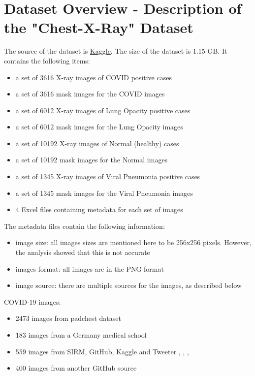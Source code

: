 \documentclass{article}
\begin{document}
\section{Dataset Overview - Description of the "Chest-X-Ray" Dataset} \label{section:data}
The source of the dataset is \href{https://www.kaggle.com/tawsifurrahman/covid19-radiography-database} {Kaggle}. The size of the dataset is 1.15 GB. It contains the following items:
\begin{itemize}
    \item a set of 3616  X-ray images of COVID positive cases
    \item a set of 3616 mask images for the COVID images
    \item a set of 6012  X-ray images of Lung Opacity positive cases
    \item a set of 6012 mask images for the Lung Opacity images
    \item a set of 10192  X-ray images of Normal (healthy) cases
    \item a set of 10192 mask images for the Normal images
    \item a set of 1345  X-ray images of Viral Pneumonia positive cases
    \item a set of 1345 mask images for the Viral Pneumonia images
    \item  4 Excel files containing metadata for each set of images
\end{itemize}

The metadata files contain the following information:
\begin{itemize}
    \item image size: all images sizes are mentioned here to be 256x256 pixels. However, the analysis showed that this is not accurate
    \item images format: all images are in the PNG format
    \item image source: there are multiple sources for the images, as described below
\end{itemize}

COVID-19 images:
\begin{itemize}
    \item 2473 images from padchest dataset \cite{url_1}
    \item 183 images from a Germany medical school \cite{url_2}
    \item 559 images from SIRM, GitHub, Kaggle and Tweeter \cite{url_3}, \cite{url_4}, \cite{url_5}, \cite{url_6}
    \item 400 images from another GitHub source \cite{url_7}
\end{itemize}
\end{document}
